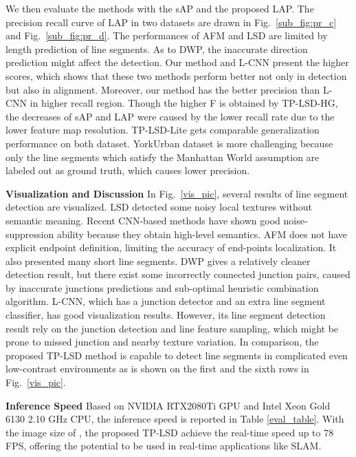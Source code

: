 \documentclass[runningheads]{llncs}
\begin{document}
We then evaluate the methods with the sAP and the proposed LAP. The precision recall curve of LAP in two datasets are drawn in Fig.~\ref{sub_fig:pr_c} and Fig.~\ref{sub_fig:pr_d}. The performances of AFM and LSD are limited by length prediction of line segments.
As to DWP, the inaccurate direction prediction might affect the detection.
Our method and L-CNN present the higher scores, which shows that these two methods perform better not only in detection but also in alignment. Moreover, our method has the better precision than L-CNN in higher recall region.
Though the higher F is obtained by TP-LSD-HG, the decreases of sAP and LAP were caused by the lower recall rate due to the lower feature map resolution. TP-LSD-Lite gets comparable generalization performance on both dataset.
YorkUrban dataset is more challenging because only the line segments which satisfy the Manhattan World assumption are labeled out as ground truth, which causes lower precision.

\textbf{Visualization and Discussion}
In Fig.~\ref{vis_pic}, several results of line segment detection are visualized.
LSD detected some noisy local textures without semantic meaning. Recent CNN-based methods have shown good noise-suppression ability because they obtain high-level semantics. AFM does not have explicit endpoint definition, limiting the accuracy of end-points localization. It also presented many short line segments.
DWP gives a relatively cleaner detection result, but there exist some incorrectly connected junction pairs, caused by inaccurate junctions predictions and sub-optimal heuristic combination algorithm. L-CNN, which has a junction detector and an extra line segment classifier, has good visualization results. However, its line segment detection result rely on the junction detection and line feature sampling, which might be prone to missed junction and nearby texture variation. In comparison, the proposed TP-LSD method is capable to detect line segments in complicated even low-contrast environments as is shown on the 
first and the sixth rows in Fig.~\ref{vis_pic}.

\textbf{Inference Speed}
Based on NVIDIA RTX2080Ti GPU and Intel Xeon Gold 6130 2.10 GHz CPU, the inference speed is reported in Table \ref{eval_table}. With the image size of , the proposed TP-LSD achieve the real-time speed up to 78 FPS, offering the potential to be used in real-time applications like SLAM.
\end{document}
